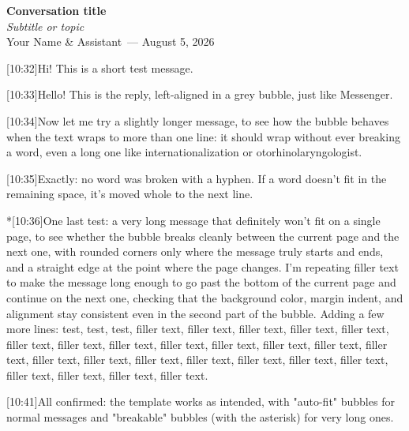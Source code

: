 \documentclass[11pt,a4paper]{article}
\makeatletter
\newcommand{\msgLabel}[2]{{\footnotesize\color{gray}#1\ifx&#2&\else\ \textbullet\ #2\fi}\par\vspace{1pt}}
\newlength{\msgWidthTmp}
\newlength{\msgMinWidth}
\newcommand{\measureMsg}[2]{%
  \sbox{\msgBoxTmp}{\begin{varwidth}{#1}\RaggedRight\linespread{1.05}\selectfont #2\end{varwidth}}%
  \setlength{\msgWidthTmp}{\wd\msgBoxTmp}%
  \addtolength{\msgWidthTmp}{16pt}%
  \ifdim\msgWidthTmp<\msgMinWidth
    \setlength{\msgWidthTmp}{\msgMinWidth}%
  \fi
}
\newcommand{\msgUser}{\@ifstar{\msgUser@long}{\msgUser@short}}
\newcommand{\msgAssistant}{\@ifstar{\msgAssistant@long}{\msgAssistant@short}}
\newcommand{\msgUser@short}[2][]{%
  \measureMsg{0.68\linewidth}{#2}%
  \begin{flushright}
  \msgLabel{You}{#1}
  \begin{tcolorbox}[bubbleBase,width=\msgWidthTmp,colback=userBlue,colframe=userBlue,
    coltext=white,tailUser]
    #2
  \end{tcolorbox}
  \end{flushright}
}
\newcommand{\msgUser@long}[2][]{%
  \begin{adjustwidth}{0.28\linewidth}{0pt}
  \msgLabel{You}{#1}
  \begin{tcolorbox}[bubbleLong,colback=userBlue,colframe=userBlue,coltext=white,tailUserLong]
    #2
  \end{tcolorbox}
  \end{adjustwidth}
}
\newcommand{\msgAssistant@short}[2][]{%
  \measureMsg{0.68\linewidth}{#2}%
  \begin{flushleft}
  \msgLabel{Assistant}{#1}
  \begin{tcolorbox}[bubbleBase,width=\msgWidthTmp,colback=assistantGrey,colframe=assistantGrey,
    coltext=black,tailAssistant]
    #2
  \end{tcolorbox}
  \end{flushleft}
}
\newcommand{\msgAssistant@long}[2][]{%
  \begin{adjustwidth}{0pt}{0.28\linewidth}
  \msgLabel{Assistant}{#1}
  \begin{tcolorbox}[bubbleLong,colback=assistantGrey,colframe=assistantGrey,coltext=black,tailAssistantLong]
    #2
  \end{tcolorbox}
  \end{adjustwidth}
}
\newcommand{\chatTitle}{Conversation title}
\newcommand{\chatSubtitle}{Subtitle or topic}
\newcommand{\chatDate}{August 5, 2026}
\newcommand{\chatParticipants}{Your Name \& Assistant}
\makeatother
\begin{document}
\begin{center}
  {\LARGE\bfseries \chatTitle}\\[4pt]
  {\large\itshape \chatSubtitle}\\[6pt]
  {\small\chatParticipants\ --- \chatDate}
\end{center}

\vspace{0.6cm}
\noindent\hrulefill
\vspace{0.6cm}


\msgUser[10:32]{Hi! This is a short test message.}

\msgAssistant[10:33]{Hello! This is the reply, left-aligned in a grey bubble, just like Messenger.}

\msgUser[10:34]{Now let me try a slightly longer message, to see how the bubble behaves when the text wraps to more than one line: it should wrap without ever breaking a word, even a long one like internationalization or otorhinolaryngologist.}

\msgAssistant[10:35]{Exactly: no word was broken with a hyphen. If a word doesn't fit in the remaining space, it's moved whole to the next line.}

\msgUser*[10:36]{One last test: a very long message that definitely won't fit on a single page, to see whether the bubble breaks cleanly between the current page and the next one, with rounded corners only where the message truly starts and ends, and a straight edge at the point where the page changes. I'm repeating filler text to make the message long enough to go past the bottom of the current page and continue on the next one, checking that the background color, margin indent, and alignment stay consistent even in the second part of the bubble. Adding a few more lines: test, test, test, filler text, filler text, filler text, filler text, filler text, filler text, filler text, filler text, filler text, filler text, filler text, filler text, filler text, filler text, filler text, filler text, filler text, filler text, filler text, filler text, filler text, filler text, filler text, filler text.}

\msgAssistant[10:41]{All confirmed: the template works as intended, with "auto-fit" bubbles for normal messages and "breakable" bubbles (with the asterisk) for very long ones.}
\end{document}
